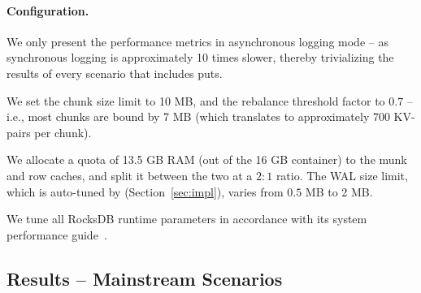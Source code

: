 \paragraph{Configuration.} 
We only present the performance metrics in asynchronous logging mode -- as synchronous logging 
is approximately 10 times slower, thereby trivializing the results of every scenario that includes puts. 

We set the \sys\/ chunk size limit to 10 MB, and the rebalance threshold factor to $0.7$ -- i.e., 
most chunks are bound by 7 MB (which translates to approximately 700 KV-pairs per chunk). 

We allocate a quota of 13.5 GB RAM (out of the 16 GB container) to the munk and row caches, 
and split it between the two at a $2:1$ ratio. The WAL size limit, which is auto-tuned by \sys\/
(Section~\ref{sec:impl}), varies from $0.5$ MB to 2 MB. 

We tune all RocksDB runtime parameters in accordance with its system performance guide~\cite{RocksDBPerf}.   

\subsection{Results -- Mainstream Scenarios}

